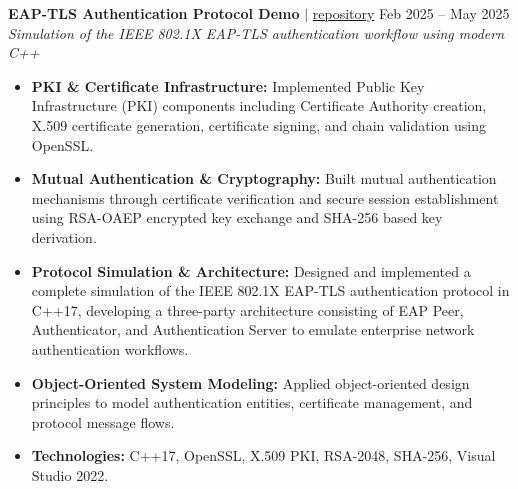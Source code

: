\documentclass[10pt,a4paper]{article}
\begin{document}
\noindent \textbf{EAP-TLS Authentication Protocol Demo} $|$ \href{https://github.com/vyquochuy/EAP-TLS-DEMO}{repository} \hfill Feb 2025 -- May 2025\\
\textit{Simulation of the IEEE 802.1X EAP-TLS authentication workflow using modern C++}
\begin{itemize}[leftmargin=0.25in, nosep]
    \item \textbf{PKI \& Certificate Infrastructure:} Implemented Public Key Infrastructure (PKI) components including Certificate Authority creation, X.509 certificate generation, certificate signing, and chain validation using OpenSSL.
    \item \textbf{Mutual Authentication \& Cryptography:} Built mutual authentication mechanisms through certificate verification and secure session establishment using RSA-OAEP encrypted key exchange and SHA-256 based key derivation.
    \item \textbf{Protocol Simulation \& Architecture:} Designed and implemented a complete simulation of the IEEE 802.1X EAP-TLS authentication protocol in C++17, developing a three-party architecture consisting of EAP Peer, Authenticator, and Authentication Server to emulate enterprise network authentication workflows.
    \item \textbf{Object-Oriented System Modeling:} Applied object-oriented design principles to model authentication entities, certificate management, and protocol message flows.
    \item \textbf{Technologies:} C++17, OpenSSL, X.509 PKI, RSA-2048, SHA-256, Visual Studio 2022.
\end{itemize}
\vspace{10pt}
\end{document}
